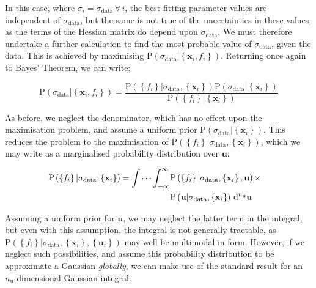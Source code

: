 In this case, where $\sigma_i = \sigma_\mathrm{data} \,\forall\, i$, the best
fitting parameter values are independent of $\sigma_\mathrm{data}$, but the
same is not true of the uncertainties in these values, as the terms of the
Hessian matrix do depend upon $\sigma_\mathrm{data}$. We must therefore
undertake a further calculation to find the most probable value of
$\sigma_\mathrm{data}$, given the data. This is achieved by maximising
$\mathrm{P}\left( \sigma_\mathrm{data} | \left\{ \mathbf{x}_i, f_i \right\}
\right)$. Returning once again to Bayes' Theorem, we can write:

\begin{equation}
\mathrm{P}\left( \sigma_\mathrm{data} | \left\{ \mathbf{x}_i, f_i \right\} \right)
= \frac{
\mathrm{P}\left( \left\{ f_i \right\} | \sigma_\mathrm{data}, \left\{ \mathbf{x}_i \right\} \right)
\mathrm{P}\left( \sigma_\mathrm{data} | \left\{ \mathbf{x}_i \right\} \right)
}{
\mathrm{P}\left( \left\{ f_i \right\} | \left\{ \mathbf{x}_i \right\} \right)
}
\end{equation}

As before, we neglect the denominator, which has no effect upon the
maximisation problem, and assume a uniform prior $\mathrm{P}\left(
\sigma_\mathrm{data} | \left\{ \mathbf{x}_i \right\} \right)$. This reduces the
problem to the maximisation of $\mathrm{P}\left( \left\{ f_i \right\} |
\sigma_\mathrm{data}, \left\{ \mathbf{x}_i \right\} \right)$, which we may
write as a marginalised probability distribution over $\mathbf{u}$:

\begin{eqnarray}
\label{eqa:p_f_given_sigma}
\mathrm{P}\left( \left\{ f_i \right\} | \sigma_\mathrm{data}, \left\{ \mathbf{x}_i \right\} \right) =
\idotsint_{-\infty}^{\infty}
&
\mathrm{P}\left( \left\{ f_i \right\} | \sigma_\mathrm{data}, \left\{ \mathbf{x}_i \right\}, \mathbf{u} \right)
\times & \\ &
\mathrm{P}\left( \mathbf{u} | \sigma_\mathrm{data}, \left\{ \mathbf{x}_i \right\} \right)
\,\mathrm{d}^{n_\mathrm{u}}\mathbf{u}
& \nonumber
\end{eqnarray}

Assuming a uniform prior for $\mathbf{u}$, we may neglect the latter term in
the integral, but even with this assumption, the integral is not generally
tractable, as $\mathrm{P}\left( \left\{ f_i \right\} | \sigma_\mathrm{data},
\left\{ \mathbf{x}_i \right\}, \left\{ \mathbf{u}_i \right\} \right)$ may well
be multimodal in form. However, if we neglect such possibilities, and assume
this probability distribution to be approximate a Gaussian \textit{globally},
we can make use of the standard result for an $n_\mathrm{u}$-dimensional Gaussian integral:

